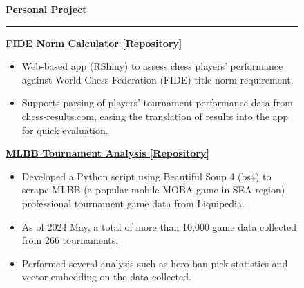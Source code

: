 \documentclass[a4paper, 10pt]{article}
\newcommand{\rhsWidth}{0.65\textwidth}
\begin{document}
\begin{figure}[h]
\begin{minipage}[t]{\rhsWidth}
	\vspace{1.0em}

	{\Large \faTools \hspace{3pt} \textbf{Personal Project}} \newline
	\rule [6pt]{\linewidth}{1pt}
	\vspace{-15pt}

	\textbf{\href{https://github.com/LiTianYeoh/FIDE_Norm_Calculator}{\color{black} FIDE Norm Calculator [\faGithub \space Repository]}}
	\vspace{-6pt}
	\begin{itemize} [itemsep = 0pt, parsep=2pt]
		\item Web-based app (RShiny) to assess chess players' performance against World Chess Federation (FIDE) title norm requirement. 
		\item Supports parsing of players' tournament performance data from chess-results.com, easing the translation of results into the app for quick evaluation.
	\end{itemize}

	\textbf{\href{https://github.com/LiTianYeoh/MLBB_Tournament_Analysis}{\color{black} MLBB Tournament Analysis [\faGithub \space Repository] }}
	\vspace{-6pt}
	\begin{itemize} [itemsep = 0pt, parsep=2pt]
		\item Developed a Python script using Beautiful Soup 4 (bs4) to scrape MLBB (a popular mobile MOBA game in SEA region) professional tournament game data from Liquipedia.
		\item As of 2024 May, a total of more than 10,000 game data collected from 266 tournaments.
		\item Performed several analysis such as hero ban-pick statistics and vector embedding on the data collected.
	\end{itemize}
\end{minipage}

\end{figure}
\end{document}
